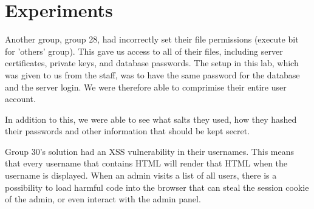 \section{Experiments}
\label{sec:experiments}

Another group, group 28, had incorrectly set their file permissions (execute bit for 'others' group).
This gave us access to all of their files, including server certificates, private keys, and database passwords.
The setup in this lab, which was given to us from the staff, was to have the same password for the database and the server login.
We were therefore able to comprimise their entire user account.


In addition to this, we were able to see what salts they used, how they hashed their passwords and other information that should be kept secret.


Group 30's solution had an XSS vulnerability in their usernames.
This means that every username that contains HTML will render that HTML when the username is displayed.
When an admin visits a list of all users, there is a possibility to load harmful code into the browser that can steal the session cookie of the admin, or even interact with the admin panel.
